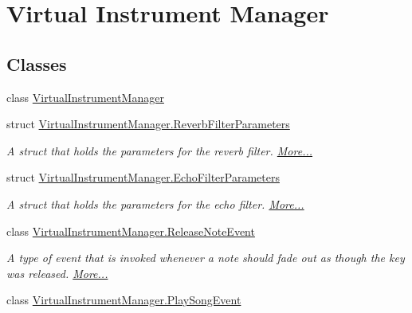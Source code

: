 \hypertarget{group___virtual_instrument_manager}{}\section{Virtual Instrument Manager}
\label{group___virtual_instrument_manager}
\subsection*{Classes}
\begin{DoxyCompactItemize}
\item 
class \hyperlink{group___virtual_instrument_manager_class_virtual_instrument_manager}{Virtual\+Instrument\+Manager}
\item 
struct \hyperlink{group___virtual_instrument_manager_struct_virtual_instrument_manager_1_1_reverb_filter_parameters}{Virtual\+Instrument\+Manager.\+Reverb\+Filter\+Parameters}
\begin{DoxyCompactList}\small\item\em A struct that holds the parameters for the reverb filter.  \hyperlink{group___virtual_instrument_manager_struct_virtual_instrument_manager_1_1_reverb_filter_parameters}{More...}\end{DoxyCompactList}\item 
struct \hyperlink{group___virtual_instrument_manager_struct_virtual_instrument_manager_1_1_echo_filter_parameters}{Virtual\+Instrument\+Manager.\+Echo\+Filter\+Parameters}
\begin{DoxyCompactList}\small\item\em A struct that holds the parameters for the echo filter.  \hyperlink{group___virtual_instrument_manager_struct_virtual_instrument_manager_1_1_echo_filter_parameters}{More...}\end{DoxyCompactList}\item 
class \hyperlink{group___virtual_instrument_manager_class_virtual_instrument_manager_1_1_release_note_event}{Virtual\+Instrument\+Manager.\+Release\+Note\+Event}
\begin{DoxyCompactList}\small\item\em A type of event that is invoked whenever a note should fade out as though the key was released.  \hyperlink{group___virtual_instrument_manager_class_virtual_instrument_manager_1_1_release_note_event}{More...}\end{DoxyCompactList}\item 
class \hyperlink{group___virtual_instrument_manager_class_virtual_instrument_manager_1_1_play_song_event}{Virtual\+Instrument\+Manager.\+Play\+Song\+Event}

\end{DoxyCompactItemize}
